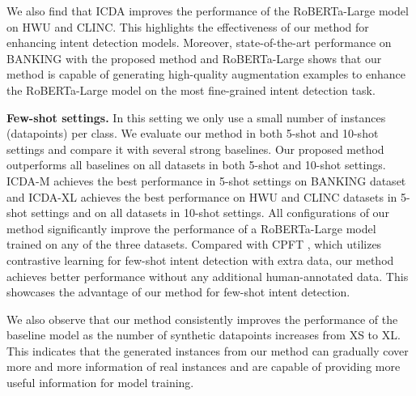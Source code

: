 \documentclass[11pt]{article}
\begin{document}
We also find that ICDA improves the performance of the RoBERTa-Large model on HWU and CLINC.
This highlights the effectiveness of our method for enhancing intent detection models.
Moreover, state-of-the-art performance on BANKING with the proposed method and RoBERTa-Large shows that our method is capable of generating high-quality augmentation examples to enhance the RoBERTa-Large model on the most fine-grained intent detection task. 



\textbf{Few-shot settings.} In this setting we only use a small number of instances (datapoints) per class.
We evaluate our method in both 5-shot and 10-shot settings and compare it with several strong baselines.
Our proposed method outperforms all baselines on all datasets in both 5-shot and 10-shot settings.
ICDA-M achieves the best performance in 5-shot settings on BANKING dataset and ICDA-XL achieves the best performance on HWU and CLINC datasets in 5-shot settings and on all datasets in 10-shot settings.
All configurations of our method significantly improve the performance of a RoBERTa-Large model trained on any of the three datasets.
Compared with CPFT \cite{zhang-etal-2021-shot}, which utilizes contrastive learning for few-shot intent detection with extra data, our method achieves better performance without any additional human-annotated data.
This showcases the advantage of our method for few-shot intent detection.

We also observe that our method consistently improves the performance of the baseline model as the number of synthetic datapoints increases from XS to XL.
This indicates that the generated instances from our method can gradually cover more and more information of real instances and are capable of providing more useful information for model training. 
\end{document}

